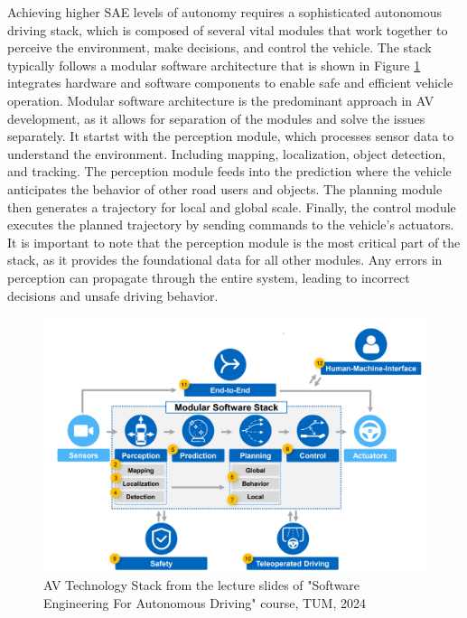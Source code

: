  Achieving higher SAE levels of autonomy requires a sophisticated autonomous driving stack,
 which is composed of several vital modules that work together to perceive the environment,
 make decisions, and control the vehicle. The stack typically follows a modular software
 architecture that is shown in Figure \ref{fig:AVStack} integrates hardware and software components to enable safe and
 efficient vehicle operation.
 Modular software architecture is the predominant approach in \ac{AV} development, as it allows for separation of the
 modules and solve the issues separately. It startst with the perception module, which processes sensor data to understand
 the environment. Including mapping, localization, object detection, and tracking. The perception module feeds into the prediction
 where the vehicle anticipates the behavior of other road users and objects. The planning module then generates a trajectory for local
 and global scale. Finally, the control module executes the planned trajectory by sending commands to the vehicle's actuators. It is important
 to note that the perception module is the most critical part of the stack, as it provides the foundational data for all other modules. Any errors
 in perception can propagate through the entire system, leading to incorrect decisions and unsafe driving behavior.

\begin{figure}[h]
    \includegraphics[scale=0.14]{figures/AVStack.png}
    \centering
    \caption{\ac{AV} Technology Stack
    from the lecture slides of "Software Engineering For Autonomous Driving" course, TUM, 2024 \cite{tum2024avstack}} %
    \label{fig:AVStack}
\end{figure}

